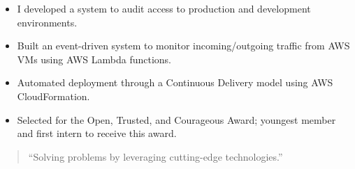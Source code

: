\documentclass[10pt,a4paper,ragged2e,withhyper]{altacv}
\begin{document}
\begin{paracol}{2}
\begin{itemize}
\item I developed a system to audit access to production and development environments.
\item Built an event-driven system to monitor incoming/outgoing traffic from AWS VMs using AWS Lambda functions.
\item Automated deployment through a Continuous Delivery model using AWS CloudFormation.
\item Selected for the Open, Trusted, and Courageous Award; youngest member and first intern to receive this award.
\end{itemize}

\switchcolumn

\begin{quote}
``Solving problems by leveraging cutting-edge technologies.''
\end{quote}




\medskip






\end{paracol}
\end{document}
